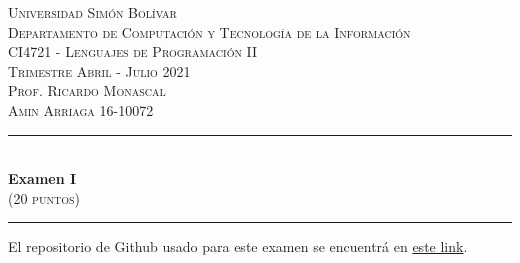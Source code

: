 \documentclass[a4paper,10pt]{article}
\date{}
\newcommand{\HRule}{\rule{\linewidth}{0.5mm}}
\begin{document}
\begin{center}
  \textsc {
    Universidad Simón Bolívar \\[0cm]
    Departamento de Computaci\'on y Tecnolog\'ia de la Informaci\'on \\[0cm]
    CI4721 - Lenguajes de Programaci\'on II \\[0cm]
    Trimestre Abril - Julio 2021 \\[0cm]
    Prof. Ricardo Monascal \\[0cm]
    Amin Arriaga 16-10072
  }
  \HRule \\[0.4cm]
  {\Large \textbf{Examen I}} \\[0.2cm]
  \textsc{(20 puntos)}
  \HRule
\end{center}

    El repositorio de Github usado para este examen se encuentr\'a en 
    \href{https://github.com/ArriagaAmin/LenguajesIIParcial1}{este link}.
\end{document}
